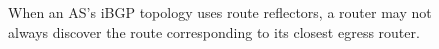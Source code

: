 \begin{figure}[t]
\begin{center}
\begin{psfrags}
\end{psfrags}
\end{center}
\caption{When an AS's iBGP topology uses route reflectors, a router may
  not always discover the route corresponding to its closest egress
  router. }
\label{fig:ibgp1}
\end{figure}

